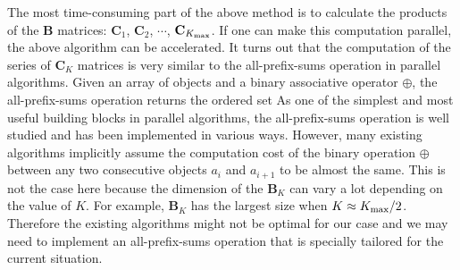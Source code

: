 The most time-consuming part of the above method is to calculate the products of the $\mathbf{B}$ 
matrices: $\mathbf{C}_1$, $\mathbf{C}_2$, $\cdots$, $\mathbf{C}_{K_{\rm max}}$. If one can make this computation
parallel, the above algorithm can be accelerated. It turns out that the computation of the series of $\mathbf{C}_K$ 
matrices is very similar to the all-prefix-sums operation in parallel algorithms\cite{BlellochTR90}. Given an array of objects
\oneline{[a_1, a_2, \cdots, a_n] \nonumber }
and a binary associative operator $\oplus$, the all-prefix-sums operation returns the ordered set
As one of the simplest and most useful building blocks in parallel algorithms\cite{BlellochTR90}, the all-prefix-sums 
operation is well studied and has been implemented in various ways\cite{gpu-book}. However, many existing 
algorithms implicitly assume the computation cost of the binary operation $\oplus$ between any two consecutive 
objects $a_i$ and $a_{i+1}$ to be almost the same. This is not the case here because the dimension of the $\mathbf{B}_{K}$ can
vary a lot depending on the value of $K$. For example,  $\mathbf{B}_{K}$ has the largest size when $K\approx K_{\rm max}/2$. 
Therefore the existing algorithms might not be optimal for our case and we may need to implement an all-prefix-sums 
operation that is specially tailored for the current 
situation. 















 